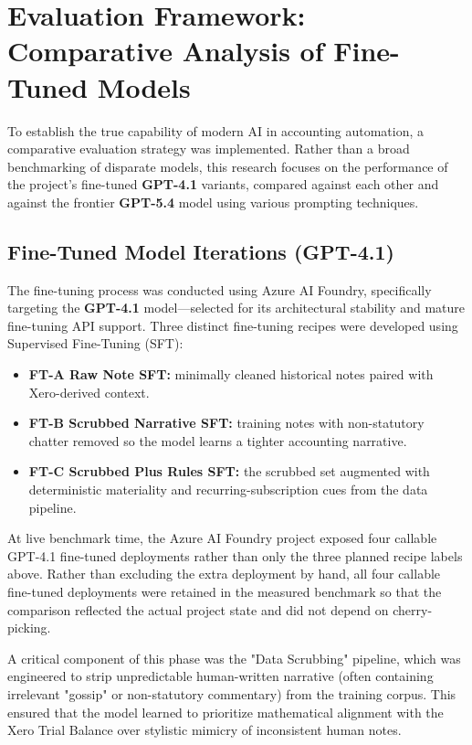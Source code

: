 \section{Evaluation Framework: Comparative Analysis of Fine-Tuned Models}
To establish the true capability of modern AI in accounting automation, a comparative evaluation strategy was implemented. Rather than a broad benchmarking of disparate models, this research focuses on the performance of the project's fine-tuned \textbf{GPT-4.1} variants, compared against each other and against the frontier \textbf{GPT-5.4} model using various prompting techniques.

\subsection{Fine-Tuned Model Iterations (GPT-4.1)}
The fine-tuning process was conducted using Azure AI Foundry, specifically targeting the \textbf{GPT-4.1} model---selected for its architectural stability and mature fine-tuning API support. Three distinct fine-tuning recipes were developed using Supervised Fine-Tuning (SFT):
\begin{itemize}
    \item \textbf{FT-A Raw Note SFT:} minimally cleaned historical notes paired with Xero-derived context.
    \item \textbf{FT-B Scrubbed Narrative SFT:} training notes with non-statutory chatter removed so the model learns a tighter accounting narrative.
    \item \textbf{FT-C Scrubbed Plus Rules SFT:} the scrubbed set augmented with deterministic materiality and recurring-subscription cues from the data pipeline.
\end{itemize}

At live benchmark time, the Azure AI Foundry project exposed four callable GPT-4.1 fine-tuned deployments rather than only the three planned recipe labels above. Rather than excluding the extra deployment by hand, all four callable fine-tuned deployments were retained in the measured benchmark so that the comparison reflected the actual project state and did not depend on cherry-picking.

A critical component of this phase was the "Data Scrubbing" pipeline, which was engineered to strip unpredictable human-written narrative (often containing irrelevant "gossip" or non-statutory commentary) from the training corpus. This ensured that the model learned to prioritize mathematical alignment with the Xero Trial Balance over stylistic mimicry of inconsistent human notes.

